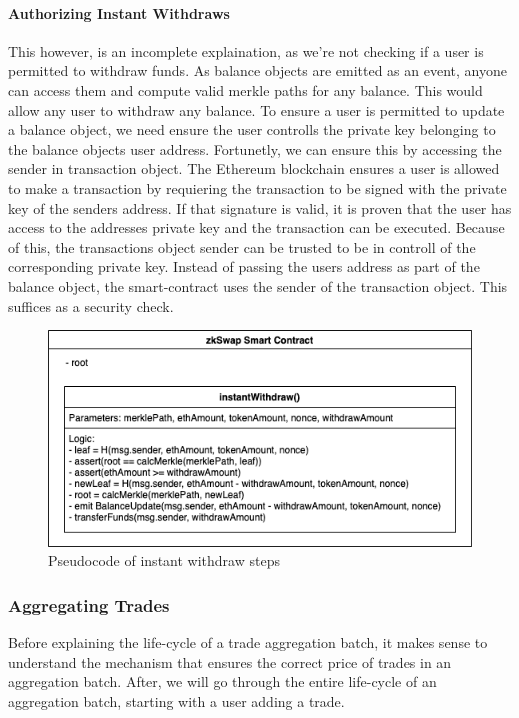 \documentclass[../../thesis.tex]{subfiles}
\begin{document}
\paragraph{Authorizing Instant Withdraws}
This however, is an incomplete explaination, as we're not checking if a user is permitted to withdraw funds. As balance objects are emitted as an event, anyone can access them and compute valid merkle paths for any balance. This would allow any user to withdraw any balance. To ensure a user is permitted to update a balance object, we need ensure the user controlls the private key belonging to the balance objects user address. Fortunetly, we can ensure this by accessing the sender in transaction object. The Ethereum blockchain ensures a user is allowed to make a transaction by requiering the transaction to be signed with the private key of the senders address. If that signature is valid, it is proven that the user has access to the addresses private key and the transaction can be executed. Because of this, the transactions object sender can be trusted to be in controll of the corresponding private key. Instead of passing the users address as part of the balance object, the smart-contract uses the sender of the transaction object. This suffices as a security check.

\begin{figure}[h]
    \centerline{\includegraphics[totalheight=5cm]{diagrams/instantWithdraw.png}}
    \caption{Pseudocode of instant withdraw steps}
    \label{fig:instWith}
\end{figure}

\subsubsection{Aggregating Trades}
Before explaining the life-cycle of a trade aggregation batch, it makes sense to understand the mechanism that ensures the correct price of trades in an aggregation batch. After, we will go through the entire life-cycle of an aggregation batch, starting with a user adding a trade. 
\end{document}
